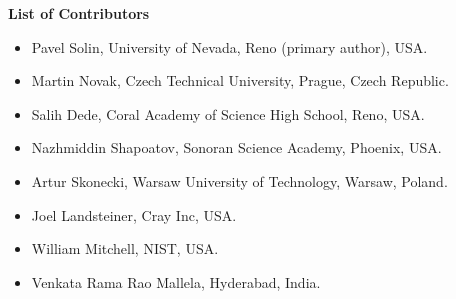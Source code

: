 \documentclass[article,A4,12pt]{llncs}
\begin{document}
{\noindent
{\bf List of Contributors}
\begin{itemize}
\item Pavel Solin, University of Nevada, Reno (primary author), USA. 
\item Martin Novak, Czech Technical University, Prague, Czech Republic.
\item Salih Dede, Coral Academy of Science High School, Reno, USA.
\item Nazhmiddin Shapoatov, Sonoran Science Academy, Phoenix, USA.
\item Artur Skonecki, Warsaw University of Technology, Warsaw, Poland.
\item Joel Landsteiner, Cray Inc, USA.
\item William Mitchell, NIST, USA.
\item Venkata Rama Rao Mallela, Hyderabad, India.
\end{itemize}

%
%
%
}
\vspace{8mm}



\newpage
\setcounter{tocdepth}{2}
\tableofcontents

\newpage

\pagestyle{plain}
\setcounter{page}{1}
\end{document}
